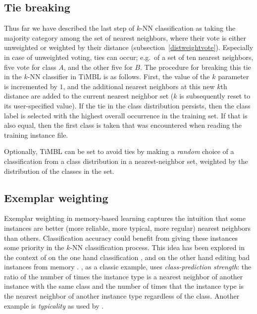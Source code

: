 \documentclass{report}
\begin{document}
\subsection{Tie breaking}
\label{tiebreaking}

Thus far we have described the last step of $k$-NN classification as
taking the majority category among the set of nearest neighbors, where
their vote is either unweighted or weighted by their distance
(subsection~\ref{distweightvote}). Especially in case of unweighted
voting, ties can occur; e.g.\ of a set of ten nearest neighbors, five
vote for class $A$, and the other five for $B$. The procedure for
breaking this tie in the $k$-NN classifier in TiMBL is as
follows. First, the value of the $k$ parameter is incremented by $1$,
and the additional nearest neighbors at this new $k$th distance are
added to the current nearest neighbor set ($k$ is subsequently reset
to its user-specified value). If the tie in the class distribution
persists, then the class label is selected with the highest overall
occurrence in the training set. If that is also equal, then the first
class is taken that was encountered when reading the training instance
file. 

Optionally, TiMBL can be set to avoid ties by making a {\em random}\/
choice of a classification from a class distribution in a
nearest-neighbor set, weighted by the distribution of the classes in
the set.

\subsection{Exemplar weighting}
\label{exemplar}

Exemplar weighting in memory-based learning captures the intuition
that some instances are better (more reliable, more typical, more
regular) nearest neighbors than others. Classification accuracy could
benefit from giving these instances some priority in the $k$-NN
classification process. This idea has been explored in the context of
on the one hand classification \cite{Salzberg90,Zhang92}, and on the
other hand editing bad instances from memory
\cite{Aha+91}. , as a classic example, uses {\em
class-prediction strength}: the ratio of the number of times the
instance type is a nearest neighbor of another instance with the same
class and the number of times that the instance type is the nearest
neighbor of another instance type regardless of the class. Another
example is {\em typicality}\/ as used by .
\end{document}
